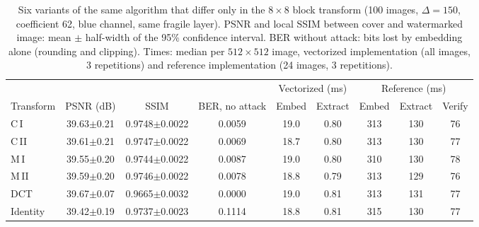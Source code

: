\begin{table}[t]
\centering
\caption{Six variants of the same algorithm that differ only in the $8\times8$ block transform (100 images, $\Delta=150$, coefficient 62, blue channel, same fragile layer). PSNR and local SSIM between cover and watermarked image: mean $\pm$ half-width of the 95\% confidence interval. BER without attack: bits lost by embedding alone (rounding and clipping). Times: median per $512\times512$ image, vectorized implementation (all images, 3 repetitions) and reference implementation (24 images, 3 repetitions).}
\label{tab:ablation6_quality}
\footnotesize
\setlength{\tabcolsep}{3pt}
\begin{tabular}{lcccccccc}
\toprule
 & & & & \multicolumn{2}{c}{Vectorized (ms)} & \multicolumn{3}{c}{Reference (ms)} \\
\cmidrule(lr){5-6}\cmidrule(lr){7-9}
Transform & PSNR (dB) & SSIM & BER, no attack & Embed & Extract & Embed & Extract & Verify \\
\midrule
C\,I & 39.63$\pm$0.21 & 0.9748$\pm$0.0022 & 0.0059 & 19.0 & 0.80 & 313 & 130 & 76 \\
C\,II & 39.61$\pm$0.21 & 0.9747$\pm$0.0022 & 0.0069 & 18.7 & 0.80 & 313 & 130 & 77 \\
M\,I & 39.55$\pm$0.20 & 0.9744$\pm$0.0022 & 0.0087 & 19.0 & 0.80 & 310 & 130 & 78 \\
M\,II & 39.59$\pm$0.20 & 0.9746$\pm$0.0022 & 0.0078 & 18.8 & 0.79 & 313 & 129 & 76 \\
DCT & 39.67$\pm$0.07 & 0.9665$\pm$0.0032 & 0.0000 & 19.0 & 0.81 & 313 & 131 & 77 \\
Identity & 39.42$\pm$0.19 & 0.9737$\pm$0.0023 & 0.1114 & 18.8 & 0.81 & 315 & 130 & 77 \\
\bottomrule
\end{tabular}
\end{table}
